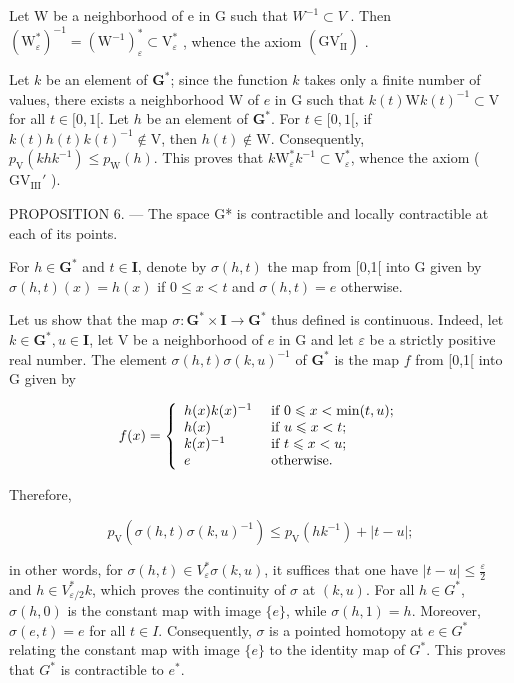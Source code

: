 Let W be a neighborhood of e in G such that \(W^{-1} \subset V\) . Then \((\mathrm{W}_{\varepsilon}^{*})^{-1} = (\mathrm{W}^{-1})_{\varepsilon}^{*} \subset \mathrm{V}_{\varepsilon}^{*}\) , whence the axiom \((\mathrm{GV}_{\mathrm{II}}^{\prime})\) .

Let \(k\) be an element of \(\mathbf{G}^*\); since the function \(k\) takes only a finite number of values, there exists a neighborhood W of \(e\) in G such that \(k(t)\mathrm{W}k(t)^{-1}\subset \mathrm{V}\) for all \(t\in [0,1[\). Let \(h\) be an element of \(\mathbf{G}^*\). For \(t\in [0,1[\), if \(k(t)h(t)k(t)^{-1}\not\in\mathrm{V}\), then \(h(t)\not\in\mathrm{W}\). Consequently, \(p_{\mathrm{V}}(khk^{-1})\leqslant p_{\mathrm{W}}(h)\). This proves that \(k\mathrm{W}_{\varepsilon}^{*}k^{-1}\subset\mathrm{V}_{\varepsilon}^{*}\), whence the axiom ( \(\mathrm{GV}_{\mathrm{III}}'\) ).

PROPOSITION 6. --- The space G* is contractible and locally contractible at each of its points.

For \(h \in \mathbf{G}^*\) and \(t \in \mathbf{I}\), denote by \(\sigma(h, t)\) the map from [0,1[ into G given by \(\sigma(h, t)(x) = h(x)\) if \(0 \leqslant x < t\) and \(\sigma(h, t) = e\) otherwise.

Let us show that the map \(\sigma\colon\mathbf{G}^{*}\times\mathbf{I}\to\mathbf{G}^{*}\) thus defined is continuous. Indeed, let \(k\in\mathbf{G}^{*}, u\in\mathbf{I}\), let V be a neighborhood of \(e\) in G and let \(\varepsilon\) be a strictly positive real number. The element \(\sigma(h,t)\sigma(k,u)^{-1}\) of \(\mathbf{G}^{*}\) is the map \(f\) from [0,1[ into G given by

\[
f (x) = \left\{ \begin{array}{l l} h (x) k (x) ^ {- 1} & \text { if } 0 \leqslant x <   \min (t, u); \\ h (x) & \text { if } u \leqslant x <   t; \\ k (x) ^ {- 1} & \text { if } t \leqslant x <   u; \\ e & \text { otherwise. } \end{array} \right.
\]

Therefore,

\[
p _ {\mathrm{V}} (\sigma (h, t) \sigma (k, u) ^ {- 1}) \leqslant p _ {\mathrm{V}} (h k ^ {- 1}) + | t - u |;
\]

in other words, for \(\sigma(h,t) \in V_{\varepsilon}^{*}\sigma(k,u)\), it suffices that one have \(|t-u| \leqslant \frac{\varepsilon}{2}\) and \(h \in V_{\varepsilon/2}^{*}k\), which proves the continuity of \(\sigma\) at \((k,u)\). For all \(h \in G^{*}\), \(\sigma(h,0)\) is the constant map with image \(\{e\}\), while \(\sigma(h,1)=h\). Moreover, \(\sigma(e,t)=e\) for all \(t \in I\). Consequently, \(\sigma\) is a pointed homotopy at \(e \in G^{*}\) relating the constant map with image \(\{e\}\) to the identity map of \(G^{*}\). This proves that \(G^{*}\) is contractible to \(e^{*}\).

